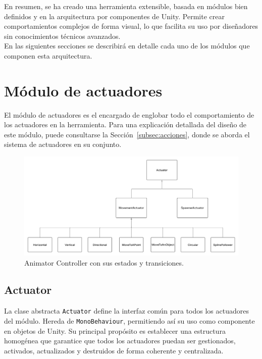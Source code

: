 En resumen, se ha creado una herramienta extensible, basada en módulos bien definidos y en la arquitectura por componentes de Unity. Permite crear comportamientos complejos de forma visual, lo que facilita su uso por diseñadores sin conocimientos técnicos avanzados.\\

En las siguientes secciones se describirá en detalle cada uno de los módulos que componen esta arquitectura.

\section{Módulo de actuadores}

El módulo de actuadores es el encargado de englobar todo el comportamiento de los actuadores en la herramienta. Para una explicación detallada del diseño de este módulo, puede consultarse la Sección~\ref{subsec:acciones}, donde se aborda el sistema de actuadores en su conjunto.
\begin{figure}[t]
	\centering
	\includegraphics[width = 1\textwidth]{Imagenes/UMLActuator2.png}
	\caption{Animator Controller con sus estados y transiciones.}
	\label{fig:AnimatorController_Image}
\end{figure}


\subsection{Actuator}

La clase abstracta \texttt{Actuator} define la interfaz común para todos los actuadores del módulo. Hereda de \texttt{MonoBehaviour}, permitiendo así su uso como componente en objetos de Unity. Su principal propósito es establecer una estructura homogénea que garantice que todos los actuadores puedan ser gestionados, activados, actualizados y destruidos de forma coherente y centralizada.\\



